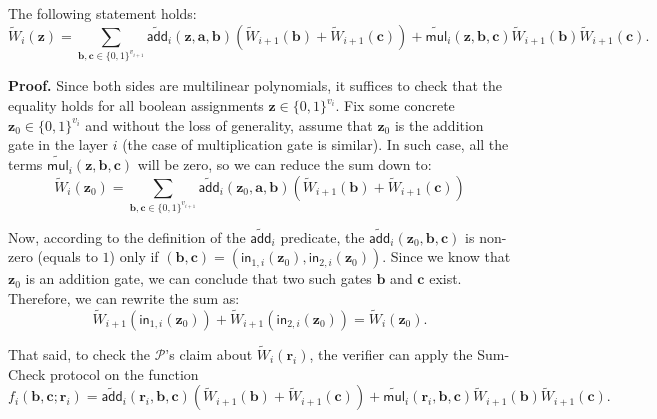 \documentclass{gkr-template}
\begin{document}
\begin{lemma}
    The following statement holds:
    \begin{equation*}
        \widetilde{W}_i(\mathbf{z}) = \sum_{\boldsymbol{b},\boldsymbol{c} \in \{0,1\}^{v_{i+1}}} \widetilde{\mathsf{add}}_i(\mathbf{z},\boldsymbol{a},\boldsymbol{b})(\widetilde{W}_{i+1}(\boldsymbol{b}) + \widetilde{W}_{i+1}(\boldsymbol{c})) + \widetilde{\mathsf{mul}}_i(\mathbf{z},\boldsymbol{b},\boldsymbol{c})\widetilde{W}_{i+1}(\boldsymbol{b})\widetilde{W}_{i+1}(\boldsymbol{c}).
    \end{equation*}
\end{lemma}

\textbf{Proof.} Since both sides are multilinear polynomials, it suffices to
check that the equality holds for all boolean assignments $\mathbf{z} \in
\{0,1\}^{v_i}$. Fix some concrete $\mathbf{z}_0 \in \{0,1\}^{v_i}$ and without
the loss of generality, assume that $\mathbf{z}_0$ is the addition gate in the
layer $i$ (the case of multiplication gate is similar). In such case, all 
the terms $\widetilde{\mathsf{mul}}_i(\mathbf{z},\boldsymbol{b},\boldsymbol{c})$ 
will be zero, so we can reduce the sum down to:
\begin{equation*}
    \widetilde{W}_i(\mathbf{z}_0) = \sum_{\boldsymbol{b},\boldsymbol{c} \in \{0,1\}^{v_{i+1}}} \widetilde{\mathsf{add}}_i(\mathbf{z}_0,\boldsymbol{a},\boldsymbol{b})(\widetilde{W}_{i+1}(\boldsymbol{b}) + \widetilde{W}_{i+1}(\boldsymbol{c}))
\end{equation*}

Now, according to the definition of the $\widetilde{\mathsf{add}}_i$ predicate,
the $\widetilde{\mathsf{add}}_i(\mathbf{z}_0,\boldsymbol{b},\boldsymbol{c})$ is
non-zero (equals to $1$) only if $(\boldsymbol{b}, \boldsymbol{c}) =
(\mathsf{in}_{1,i}(\mathbf{z}_0), \mathsf{in}_{2,i}(\mathbf{z}_0))$. Since we
know that $\mathbf{z}_0$ is an addition gate, we can conclude that two such
gates $\boldsymbol{b}$ and $\boldsymbol{c}$ exist. Therefore, we can rewrite the
sum as:
\begin{equation*}
    \widetilde{W}_{i+1}(\mathsf{in}_{1,i}(\mathbf{z}_0)) + \widetilde{W}_{i+1}(\mathsf{in}_{2,i}(\mathbf{z}_0)) = \widetilde{W}_i(\mathbf{z}_0).
\end{equation*}

That said, to check the $\mathcal{P}$'s claim about $\widetilde{W}_i(\mathbf{r}_i)$, the verifier 
can apply the Sum-Check protocol on the function
\begin{equation*}
    f_i(\boldsymbol{b}, \boldsymbol{c}; \mathbf{r}_i) = \widetilde{\mathsf{add}}_i(\mathbf{r}_i, \boldsymbol{b}, \boldsymbol{c})(\widetilde{W}_{i+1}(\boldsymbol{b}) + \widetilde{W}_{i+1}(\boldsymbol{c})) + \widetilde{\mathsf{mul}}_i(\mathbf{r}_i, \boldsymbol{b}, \boldsymbol{c})\widetilde{W}_{i+1}(\boldsymbol{b})\widetilde{W}_{i+1}(\boldsymbol{c}).
\end{equation*}
\end{document}
